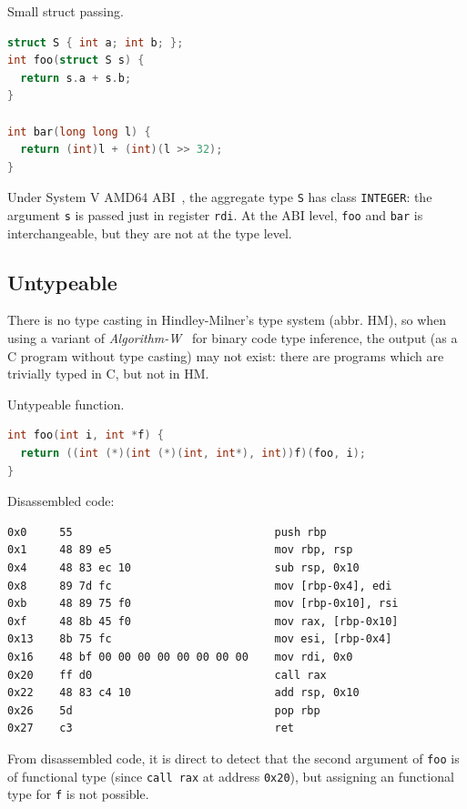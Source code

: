 \documentclass[a4paper]{llncs}
\begin{document}
\begin{example}\label{exa:register_struct}
Small struct passing.

\begin{lstlisting}[frame=lines, language={C}]
struct S { int a; int b; };
int foo(struct S s) {
  return s.a + s.b;
}

int bar(long long l) {
  return (int)l + (int)(l >> 32);
}
\end{lstlisting}

Under System V AMD64 ABI~\cite{lu_system_nodate}, the aggregate type \texttt{S}
has class \texttt{INTEGER}: the argument \texttt{s} is passed just in register \texttt{rdi}.
At the ABI level, \texttt{foo} and \texttt{bar} is interchangeable, but they are not at
the type level.
\end{example}

\subsection{Untypeable}

There is no type casting in Hindley-Milner's type system (abbr. HM), so when using a variant of
\emph{Algorithm-W}~\cite{milner_theory_1978} for binary code type inference, the output (as a
C program without type casting) may not exist: there are programs which are
trivially typed in C, but not in HM.

\begin{example}\label{exa:untypeable}
Untypeable function.
\begin{lstlisting}[frame=topline, language={C}]
int foo(int i, int *f) {
  return ((int (*)(int (*)(int, int*), int))f)(foo, i);
}
\end{lstlisting}
Disassembled code:
\begin{lstlisting}[frame=bottomline, language={[x86masm]Assembler}]
0x0     55                               push rbp
0x1     48 89 e5                         mov rbp, rsp
0x4     48 83 ec 10                      sub rsp, 0x10
0x8     89 7d fc                         mov [rbp-0x4], edi
0xb     48 89 75 f0                      mov [rbp-0x10], rsi
0xf     48 8b 45 f0                      mov rax, [rbp-0x10]
0x13    8b 75 fc                         mov esi, [rbp-0x4]
0x16    48 bf 00 00 00 00 00 00 00 00    mov rdi, 0x0
0x20    ff d0                            call rax
0x22    48 83 c4 10                      add rsp, 0x10
0x26    5d                               pop rbp
0x27    c3                               ret
\end{lstlisting}

From disassembled code, it is direct to detect that the second argument
of \texttt{foo} is of functional type (since \texttt{call rax} at address \texttt{0x20}),
but assigning an functional type for \texttt{f} is not possible.
\end{example}
\end{document}
